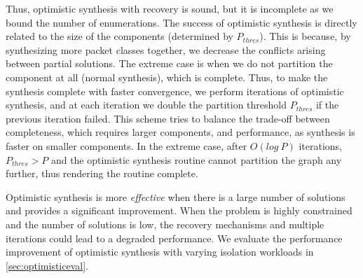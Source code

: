Thus, optimistic synthesis with recovery is sound, but 
it is incomplete as we bound the
number of enumerations. The success of optimistic synthesis
is directly related to the size of the components (determined by $P_{thres}$). 
This is because, by synthesizing more packet classes together, we decrease the
conflicts arising between partial solutions. The extreme case is when we do not 
partition the component at all (normal synthesis), which is complete. 
Thus, to make the synthesis complete with faster convergence, we
perform iterations of optimistic synthesis, and at each iteration we double the
partition threshold $P_{thres}$ if the previous iteration failed. 
This scheme tries to balance the trade-off between completeness, which
requires larger components, and performance, as synthesis is faster on smaller
components. 
In the extreme case, after $O(log~P)$
iterations, $P_{thres} > P$ and the optimistic synthesis routine cannot partition the graph any further,
thus rendering the routine complete. 
 
 Optimistic synthesis is more \emph{effective}
 when there is a large number of solutions and provides a
 significant improvement. When the problem is highly 
 constrained and the number of solutions is low, 
 the recovery mechanisms and multiple iterations could 
 lead to a degraded performance. 
 We evaluate the performance improvement of optimistic
 synthesis with varying isolation workloads in \cref{sec:optimisticeval}.

 
%
